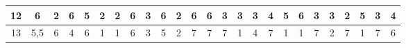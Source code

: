 \begin{sidewaystable}[]
\begin{tabular}{|c|c|c|c|c|c|c|c|c|c|c|c|c|c|c|c|c|c|c|c|c|c|c|c|c|}
    12      & 6                                               & 2                                               & 6                                               & 5                                               & 2                                               & 2                                               & 6                                               & 3                                               & 6                                               & 2                                                & 6                                                & 6                                                & 3                                               & 3                                               & 3                                               & 4                                               & 5                                               & 6                                               & 3                                               & 3                                                 & 2                                               & 5                                                & 3                                                & 4                                                \\ \hline
    13      & 5,5                                             & 6                                               & 4                                               & 6                                               & 1                                               & 1                                               & 6                                               & 3                                               & 5                                               & 2                                                & 7                                                & 7                                                & 7                                               & 1                                               & 4                                               & 7                                               & 1                                               & 1                                               & 7                                               & 2                                                 & 7                                               & 1                                                & 7                                                & 6                                                \\ \hline

\end{tabular}
\end{sidewaystable}
